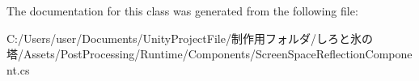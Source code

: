 The documentation for this class was generated from the following file\+:\begin{DoxyCompactItemize}
\item 
C\+:/\+Users/user/\+Documents/\+Unity\+Project\+File/制作用フォルダ/しろと氷の塔/\+Assets/\+Post\+Processing/\+Runtime/\+Components/Screen\+Space\+Reflection\+Component.\+cs\end{DoxyCompactItemize}
